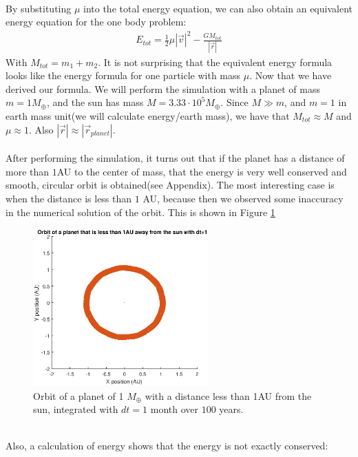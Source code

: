 \\
By substituting $\mu$ into the total energy equation, we can also obtain an equivalent energy equation for the one body problem:
\begin{align}
E_{tot}=\frac{1}{2}\mu |\vec{v}|^2-\frac{GM_{tot}}{|\vec{r}|}
\end{align}
With $M_{tot}=m_1+m_2$. It is not surprising that the equivalent energy formula looks like the energy formula for one particle with mass $\mu$. Now that we have derived our formula. We will perform the simulation with a planet of mass $m=1M_{\oplus}$, and the sun has mass $M=3.33\cdot 10^5 M_{\oplus}$. Since $M\gg m$, and $m=1$ in earth mass unit(we will calculate energy/earth mass), we have that $M_{tot}\approx M$ and $\mu\approx 1$. Also $|\vec{r}|\approx |\vec{r}_{planet}|$.\\
\\
After performing the simulation, it turns out that if the planet has a distance of more than $1$AU to the center of mass, that the energy is very well conserved and smooth, circular orbit is obtained(see Appendix). The most interesting case is when the distance is less than $1$ AU, because then we observed some inaccuracy in the numerical solution of the orbit. This is shown in Figure \ref{fig:Planet1AUdt1} 
\begin{figure}[H]
\centering
\includegraphics[width=0.6\textwidth]{Planeet_1AU_dt1_100jaar.eps}
\caption{Orbit of a planet of 1 $M_{\oplus}$ with a distance less than 1AU from the sun, integrated with $dt=1$ month over $100$ years.}
    \label{fig:Planet1AUdt1}
\end{figure}
\leavevmode
\\
Also, a calculation of energy shows that the energy is not exactly conserved:
